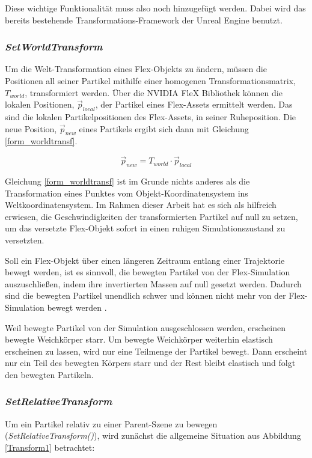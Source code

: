 Diese wichtige Funktionalität muss also noch hinzugefügt werden. Dabei wird das bereits bestehende Transformations-Framework der Unreal Engine benutzt.

\subsubsection{\textit{SetWorldTransform}}

Um die Welt-Transformation eines Flex-Objekts zu ändern, müssen die Positionen all seiner Partikel mithilfe einer homogenen Transformationsmatrix, $T_{world}$, transformiert werden. Über die NVIDIA FleX Bibliothek können die lokalen Positionen, $\vec{p}_{local}$, der Partikel eines Flex-Assets 
ermittelt werden. Das sind die lokalen Partikelpositionen des Flex-Assets, in seiner Ruheposition. Die neue Position, $\vec{p}_{new}$ eines Partikels ergibt sich dann mit Gleichung \ref{form_worldtransf}.

\begin{equation}
\vec{p}_{new} = T_{world} \cdot \vec{p}_{local}
\label{form_worldtransf}
\end{equation}

Gleichung \ref{form_worldtransf} ist im Grunde nichts anderes als die Transformation eines Punktes vom Objekt-Koordinatensystem ins Weltkoordinatensystem. Im Rahmen dieser Arbeit hat es sich als hilfreich erwiesen, die Geschwindigkeiten der transformierten Partikel auf null zu setzen, um das versetzte Flex-Objekt sofort in einen ruhigen Simulationszustand zu versetzten. 

Soll ein Flex-Objekt  über einen längeren Zeitraum entlang einer Trajektorie bewegt werden, ist es sinnvoll, die bewegten Partikel von der Flex-Simulation auszuschließen, indem ihre invertierten Massen auf null gesetzt werden. Dadurch sind die bewegten Partikel unendlich schwer und können nicht mehr von der Flex-Simulation bewegt werden \cite{PBD} \cite{UPP}. 

Weil bewegte Partikel von der Simulation ausgeschlossen werden, erscheinen bewegte Weichkörper starr. Um bewegte Weichkörper weiterhin elastisch erscheinen zu lassen, wird nur eine Teilmenge der Partikel bewegt. Dann erscheint nur ein Teil des bewegten Körpers starr und der Rest bleibt elastisch und folgt den bewegten Partikeln.

\subsubsection{\textit{SetRelativeTransform}}
\label{subsubsec_reltrans}
Um ein Partikel relativ zu einer Parent-Szene zu bewegen (\textit{SetRelativeTransform()}), wird zunächst die allgemeine Situation aus Abbildung \ref{Transform1} betrachtet:

